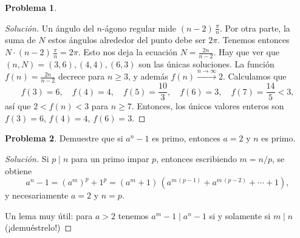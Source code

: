 \documentclass{article}
\theoremstyle{definition}
\newtheorem{problema}{Problema}
\newenvironment{solucion}{\begin{proof}[Solución]\small}{\end{proof}}
\begin{document}
\begin{problema}
  \ifdefined\solutions\begin{solucion}

    Un ángulo del $n$-ágono regular mide $(n-2)\,\frac{\pi}{n}$. Por otra parte,
    la suma de $N$ estos ángulos alrededor del punto debe ser $2\pi$. Tenemos
    entonces $N\cdot (n-2)\,\frac{\pi}{n} = 2\pi$. Esto nos deja la ecuación
    $N = \frac{2n}{n-2}$. Hay que ver que $(n,N) = (3,6), (4,4), (6,3)$ son las
    únicas soluciones. La función $f (n) = \frac{2n}{n-2}$ decrece para
    $n \ge 3$, y además $f (n) \xrightarrow{n\to \infty} 2$. Calculamos que
    $$f (3) = 6, \quad f (4) = 4, \quad f (5) = \frac{10}{3}, \quad f (6) = 3, \quad f (7) = \frac{14}{5} < 3,$$
    así que $2 < f (n) < 3$ para $n \ge 7$. Entonces, los únicos valores enteros
    son $f (3) = 6$, $f (4) = 4$, $f (6) = 3$.
  \end{solucion}\fi
 \end{problema}

 \begin{problema}
   Demuestre que si $a^n - 1$ es primo, entonces $a = 2$ y $n$ es primo.

   \ifdefined\solutions\begin{solucion}
     Si $p \mid n$ para un primo impar $p$, entonces escribiendo $m = n/p$,
     se obtiene
     $$a^n - 1 = (a^m)^p + 1^p = (a^m + 1)\,(a^{m\,(p-1)} + a^{m\,(p-2)} + \cdots + 1),$$
     y necesariamente $a = 2$ y $n = p$.

     Un lema muy útil: para $a > 2$ tenemos $a^m - 1 \mid a^n - 1$ si y
     solamente si $m \mid n$ (¡demuéstrelo!)
   \end{solucion}\fi
\end{problema}
\end{document}
